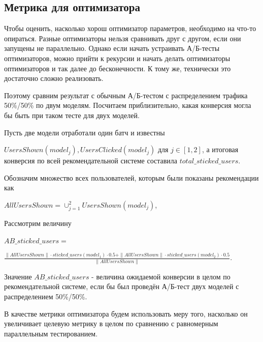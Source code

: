 \documentclass{article}
\begin{document}
\subsection{Метрика для оптимизатора}
Чтобы оценить, насколько хорош оптимизатор параметров, необходимо на что-то опираться. Разные оптимизаторы нельзя сравнивать друг с другом, если они запущены не параллельно. Однако если начать устраивать А/Б-тесты оптимизаторов, можно прийти к рекурсии и начать делать оптимизаторы оптимизаторов и так далее до бесконечности. К тому же, технически это достаточно сложно реализовать.
\par
Поэтому сравним результат с обычным А/Б-тестом с распределением трафика 50\%/50\% по двум моделям. Посчитаем приблизительно, какая конверсия могла бы быть при таком тесте для двух моделей.
\par
Пусть две модели отработали один батч и известны
\par
\vspace{3mm}
$UsersShown(model_j), UsersClicked(model_j)$ для $j \in [1,2]$, а итоговая конверсия по всей рекомендательной системе составила $total\_sticked\_users$. 
\par
\vspace{3mm}
Обозначим множество всех пользователей, которым были показаны рекомендации как 
\par
\vspace{3mm}
$AllUsersShown = \cup_{j=1}^2{UsersShown(model_j)}$,

\par
\vspace{3mm}
Рассмотрим величину
\par
\vspace{3mm}
$AB\_sticked\_users =$
\par
\vspace{3mm}
$\frac {\|AllUsersShown\| \cdot sticked\_users(model_1) \cdot 0.5 + \|AllUsersShown\| \cdot sticked\_users(model_2) \cdot 0.5 }{\|AllUsersShown\|}$.

\par
\vspace{3mm}

Значение $AB\_sticked\_users$ - величина ожидаемой конверсии в целом по рекомендательной системе, если бы был проведён А/Б-тест двух моделей с распределением 50\%/50\%.

\par

В качестве метрики оптимизатора будем использовать меру того, насколько он увеличивает целевую метрику в целом по сравнению с равномерным параллельным тестированием.
\end{document}
